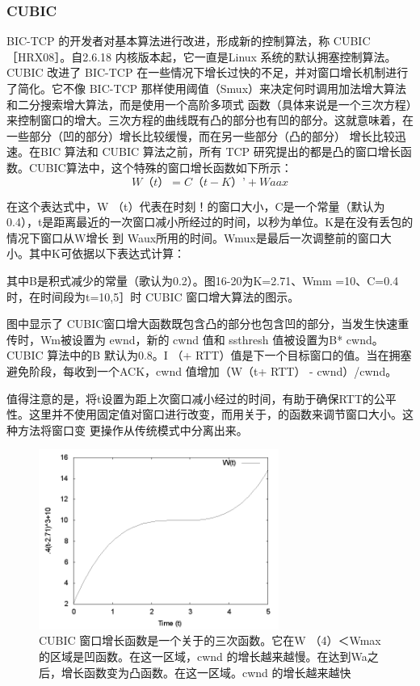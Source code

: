 \subsubsection{CUBIC}
BIC-TCP 的开发者对基本算法进行改进，形成新的控制算法，称 CUBIC ［HRX08］。自2.6.18 内核版本起，它一直是Linux 系统的默认拥塞控制算法。CUBIC 改进了 BIC-TCP
在一些情况下增长过快的不足，并对窗口增长机制进行了简化。它不像 BIC-TCP 那样使用阈值（Smux）来决定何时调用加法增大算法和二分搜索增大算法，而是使用一个高阶多项式
函数（具体来说是一个三次方程）来控制窗口的增大。三次方程的曲线既有凸的部分也有凹的部分。这就意味着，在一些部分（凹的部分）增长比较缓慢，而在另一些部分（凸的部分）
增长比较迅速。在BIC 算法和 CUBIC 算法之前，所有 TCP 研究提出的都是凸的窗口增长函数。CUBIC算法中，这个特殊的窗口增长函数如下所示：
\begin{equation}
    W（t）=C（t-K）’+Waax
\end{equation}

在这个表达式中，W （t）代表在时刻！的窗口大小，C是一个常量（默认为 0.4），t是距离最近的一次窗口减小所经过的时间，以秒为单位。K是在没有丢包的情况下窗口从W增长
到 Waux所用的时间。Wmux是最后一次调整前的窗口大小。其中K可依据以下表达式计算：

其中B是积式减少的常量（歌认为0.2）。图16-20为K=2.71、Wmm =10、C=0.4时，在时间段为t=10,5］时 CUBIC 窗口增大算法的图示。

图中显示了 CUBIC窗口增大函数既包含凸的部分也包含凹的部分，当发生快速重传时，Wm被设置为 ewnd，新的 cwnd 值和 ssthresh 值被设置为B* cwnd。 CUBIC 算法中的B
默认为0.8。I （+ RTT）值是下一个目标窗口的值。当在拥塞避免阶段，每收到一个ACK，cwnd 值增加（W（t+ RTT） - cwnd）/cwnd。

值得注意的是，将t设置为距上次窗口减小经过的时间，有助于确保RTT的公平性。这里并不使用固定值对窗口进行改变，而用关于，的函数来调节窗口大小。这种方法将窗口变
更操作从传统模式中分离出来。

\begin{figure}[!htb]
    \centering
	\includegraphics[width=0.7\textwidth]{imgs/16/16-20.png}
	\caption{CUBIC 窗口增长函数是一个关于的三次函数。它在W （4）＜Wmax 的区域是凹函数。在这一区域，cwnd 的增长越来越慢。在达到Wa之后，增长函数变为凸函数。在这一区域。cwnd
        的增长越来越快}
\end{figure}

